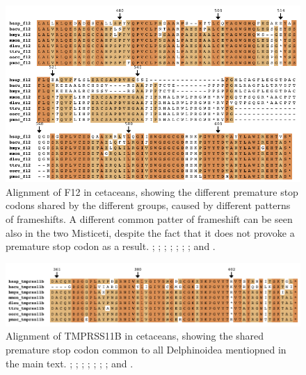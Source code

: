 \begin{figure}
    \begin{center}
        \includegraphics[width=\textwidth]{figures/a_f12_whole.pdf}
        \caption[Alignment of F12 in cetaceans]{Alignment of F12 in cetaceans, showing the different premature stop codons shared by the different groups, caused by different patterns of frameshifts. A different common patter of frameshift can be seen also in the two Misticeti, despite the fact that it does not provoke a premature stop codon as a result. \hsap; \bacu; \bmys; \mmon; \dleu; \ttru; \oorc; and \pmac.}
        \label{app_f_f12_align}
    \end{center}
\end{figure}

\begin{figure}
    \begin{center}
        \includegraphics[width=\textwidth]{figures/a_tmprss11b_end.pdf}
        \caption[Alignment of TMPRSS11B in cetaceans, end segment]{Alignment of TMPRSS11B in cetaceans, showing the shared premature stop codon common to all Delphinoidea mentiopned in the main text. \hsap; \bacu; \bmys; \mmon; \dleu; \ttru; \oorc; and \pmac.}
        \label{app_f_tmprss11b_align}
    \end{center}
\end{figure}

